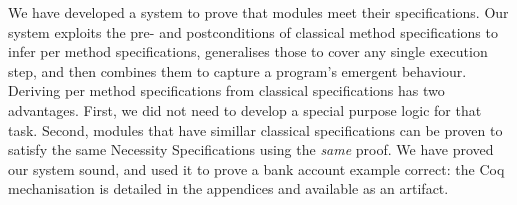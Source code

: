 We have developed a   system to prove that modules meet their specifications.  Our  system exploits the
pre- and
postconditions of classical method specifications to infer per method \Nec specifications, 
generalises those to cover any single execution step,
and then combines them to capture a program's emergent behaviour.
%
%
%
%
%
Deriving per method \Nec specifications from classical specifications
has two advantages. First, we
did not need to develop a special purpose logic for that task. Second,
modules that have simillar classical 
specifications can be proven to satisfy the same Necessity
Specifications using the \emph{same} proof.
%
%
We have proved our system sound, and used it to
prove a bank account example correct: the Coq mechanisation is
detailed in the appendices and available as an artifact.

%
%
%
%

%
%





